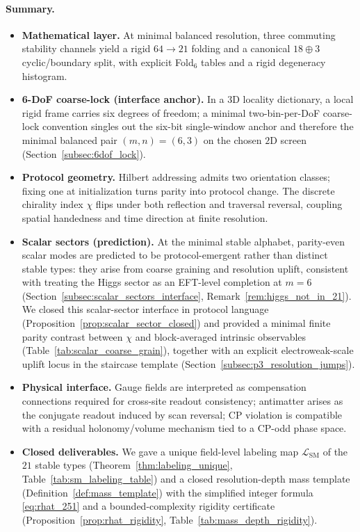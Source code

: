 \paragraph{Summary.}
\begin{itemize}
\item \textbf{Mathematical layer.}
At minimal balanced resolution, three commuting stability channels yield a rigid $64\to 21$ folding and a canonical $18\oplus 3$ cyclic/boundary split, with explicit Fold$_6$ tables and a rigid degeneracy histogram.
\item \textbf{6-DoF coarse-lock (interface anchor).}
In a $3$D locality dictionary, a local rigid frame carries six degrees of freedom; a minimal two-bin-per-DoF coarse-lock convention singles out the six-bit single-window anchor and therefore the minimal balanced pair $(m,n)=(6,3)$ on the chosen $2$D screen (Section~\ref{subsec:6dof_lock}).
\item \textbf{Protocol geometry.}
Hilbert addressing admits two orientation classes; fixing one at initialization turns parity into protocol change.
The discrete chirality index $\chi$ flips under both reflection and traversal reversal, coupling spatial handedness and time direction at finite resolution.
\item \textbf{Scalar sectors (prediction).}
At the minimal stable alphabet, parity-even scalar modes are predicted to be protocol-emergent rather than distinct stable types: they arise from coarse graining and resolution uplift, consistent with treating the Higgs sector as an EFT-level completion at $m=6$ (Section~\ref{subsec:scalar_sectors_interface}, Remark~\ref{rem:higgs_not_in_21}).
We closed this scalar-sector interface in protocol language (Proposition~\ref{prop:scalar_sector_closed}) and provided a minimal finite parity contrast between $\chi$ and block-averaged intrinsic observables (Table~\ref{tab:scalar_coarse_grain}), together with an explicit electroweak-scale uplift locus in the staircase template (Section~\ref{subsec:p3_resolution_jumps}).
\item \textbf{Physical interface.}
Gauge fields are interpreted as compensation connections required for cross-site readout consistency; antimatter arises as the conjugate readout induced by scan reversal; CP violation is compatible with a residual holonomy/volume mechanism tied to a CP-odd phase space.
\item \textbf{Closed deliverables.}
We gave a unique field-level labeling map $\mathcal{L}_{\mathrm{SM}}$ of the $21$ stable types (Theorem~\ref{thm:labeling_unique}, Table~\ref{tab:sm_labeling_table}) and a closed resolution-depth mass template (Definition~\ref{def:mass_template}) with the simplified integer formula \eqref{eq:rhat_251} and a bounded-complexity rigidity certificate (Proposition~\ref{prop:rhat_rigidity}, Table~\ref{tab:mass_depth_rigidity}).

\end{itemize}

